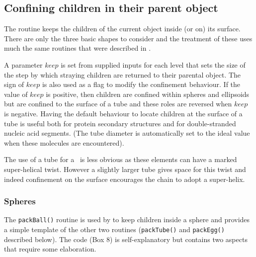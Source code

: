 \subsection{Confining children in their parent object}

The  routine keeps the children of the current object inside (or on) its
surface.  There are only the three basic shapes to consider and the treatment
of these uses much the same routines that were described in .

A parameter $keep$ is set from supplied inputs for each level that sets
the size of the step by which straying children are returned to their parental
object.   The sign of $keep$ is also used as a flag to modify the confinement
behaviour.  If the value of $keep$ 
is positive, then children are confined within spheres and ellipsoids but
are confined to the surface of a tube and these roles are reversed when
$keep$ is negative.   Having the default behaviour to locate children at the
surface of a tube is useful both for protein secondary structures and for
double-stranded nucleic acid segments.  (The tube diameter is automatically
set to the ideal value when these molecules are encountered).  

The use of a tube for a \Bs\ is less obvious as these elements can have a marked 
super-helical twist. However a slightly larger tube gives space for this twist
and indeed confinement on the surface encourages the chain to adopt a super-helix.   

\subsubsection{Spheres}

The {\tt packBall()} routine is used by  to keep children inside a sphere and
provides a simple template of the other two routines ({\tt packTube()} and {\tt packEgg()}
described below).    The code (Box 8) is self-explanatory but contains two aspects that
require some elaboration.

